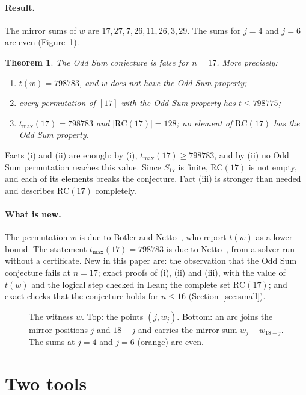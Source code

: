 \documentclass[11pt]{article}
\newtheorem{theorem}{Theorem}
\theoremstyle{remark}
\newcommand{\RC}{\mathrm{RC}}
\newcommand{\tmax}{t_{\max}}
\begin{document}
\paragraph{Result.}
The mirror sums of $w$ are $17, 27, 7, 26, 11, 26, 3, 29$. The sums for $j = 4$ and $j = 6$ are even (Figure~\ref{fig:witness}).

\begin{theorem}\label{thm:main}
The Odd Sum conjecture is false for $n = 17$. More precisely:
\begin{enumerate}
\item[(i)] $t(w) = 798783$, and $w$ does not have the Odd Sum property;
\item[(ii)] every permutation of $[17]$ with the Odd Sum property has $t \le 798775$;
\item[(iii)] $\tmax(17) = 798783$ and $|\RC(17)| = 128$; no element of $\RC(17)$ has the Odd Sum property.
\end{enumerate}
\end{theorem}

Facts (i) and (ii) are enough: by (i), $\tmax(17) \ge 798783$, and by (ii) no Odd Sum permutation reaches this value. Since $S_{17}$ is finite, $\RC(17)$ is not empty, and each of its elements breaks the conjecture. Fact (iii) is stronger than needed and describes $\RC(17)$ completely.

\paragraph{What is new.}
The permutation $w$ is due to Botler and Netto~\cite{BN}, who report $t(w)$ as a lower bound. The statement $\tmax(17) = 798783$ is due to Netto~\cite{Netto}, from a solver run without a certificate. New in this paper are: the observation that the Odd Sum conjecture fails at $n = 17$; exact proofs of (i), (ii) and (iii), with the value of $t(w)$ and the logical step checked in Lean; the complete set $\RC(17)$; and exact checks that the conjecture holds for $n \le 16$ (Section~\ref{sec:small}).

\begin{figure}[t]
\centering

\caption{The witness $w$. Top: the points $(j, w_j)$. Bottom: an arc joins the mirror positions $j$ and $18-j$ and carries the mirror sum $w_j + w_{18-j}$. The sums at $j = 4$ and $j = 6$ (orange) are even.}
\label{fig:witness}
\end{figure}

\section{Two tools}
\end{document}
